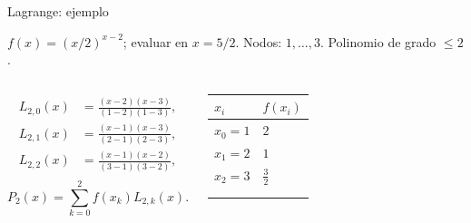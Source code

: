 \documentclass[main.tex]{subfiles}
\begin{document}
\begin{frame}[t]{Lagrange: ejemplo}
\par\noindent\begin{minipage}[t][7.5mm][t]{\textwidth}\small\strut $f(x)=(x/2)^{x-2}$; evaluar en $x=5/2$. Nodos: $1,\ldots,3$. Polinomio de grado $\le 2$.\end{minipage}\par\nointerlineskip
\begin{columns}[T]\small\setlength{\abovedisplayskip}{4pt}\setlength{\belowdisplayskip}{4pt}\scriptsize\begin{align*}L_{2,0}(x)&=\frac{(x-2)(x-3)}{(1-2)(1-3)},\\L_{2,1}(x)&=\frac{(x-1)(x-3)}{(2-1)(2-3)},\\L_{2,2}(x)&=\frac{(x-1)(x-2)}{(3-1)(3-2)},\\\end{align*}\[P_2(x)=\sum_{k=0}^2f(x_k)L_{2,k}(x).\]\begingroup\small\setlength{\tabcolsep}{3pt}\begin{center}\begin{tabular}{|C{.42\textwidth}|C{.42\textwidth}|}\hline
\rule[-2mm]{0pt}{6mm}$x_i$&$f(x_i)$\\\hline
\rule[-2.5mm]{0pt}{6mm}$x_0=1$&$2$\\\hline
\rule[-2.5mm]{0pt}{6mm}$x_1=2$&$1$\\\hline
\rule[-2.5mm]{0pt}{6mm}$x_2=3$&$\frac{3}{2}$\\\hline
\rule[-2.5mm]{0pt}{6mm}&\\\hline
\rule[-2.5mm]{0pt}{6mm}&\\\hline
\end{tabular}\end{center}\endgroup\par
\end{columns}
\end{frame}
\end{document}
